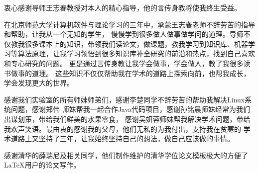 
\begin{ack}
  衷心感谢导师王志春教授对本人的精心指导，他的言传身教将使我终生受益。

  在北京师范大学计算机软件与理论学习的三年中，承蒙王志春老师不辞劳苦的指导和帮助，让我从一个无知的学生，
  慢慢学到很多做人做事做学问的道理。导师不仅教我很多课本上的知识，带领我们读论文，做课题，教我学习到知识库、机器学习等算法原理，让我学习领悟到很多知识库补全研究的前沿和热点，找到自己喜欢和专心研究的问题。
  更是通过言传身教让我学会做事，学会做人，教了我很多读书做事的道理。
  这些知识不仅仅帮助我在学术的道路上探索向前，也帮我成长，学会发现更大的世界。

  感谢我们实验室的所有师妹师弟们，感谢李楚同学不辞劳苦的帮助我解决Linux系统问题，感谢郑伟
  师妹帮我一起合作Java代码项目，感谢孙铭晨师妹经常为我们出谋划策，带给我们鲜美的水果零食，
  感谢吴妍蓉师妹帮我解决学术问题，带给我欢声笑语。最由衷的感谢我的父母，他们无私的为我付出，支持我在贫寒的
  学术道路上又坚持了三年，让我始终坚持自己的想法，做自己应该做的事情。

  感谢清华的薛瑞尼及相关同学，他们制作维护的清华学位论文模板极大的方便了\LaTeX{}用户的论文写作。


\end{ack}
